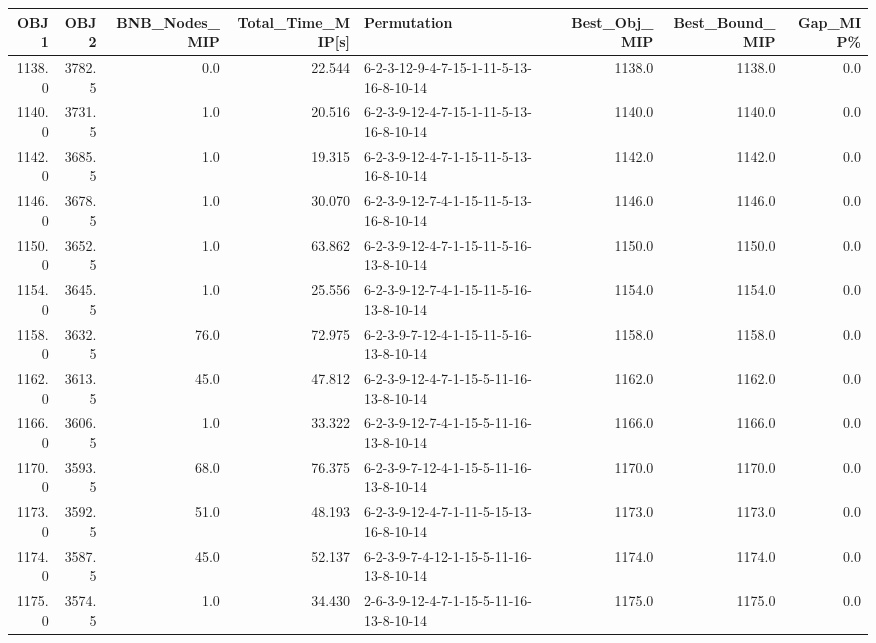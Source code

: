 \begin{tabular}{rrrrlrrr}
\toprule
   OBJ1 &    OBJ2 &  BNB\_Nodes\_MIP &  Total\_Time\_MIP[s] &                             Permutation &  Best\_Obj\_MIP &  Best\_Bound\_MIP &  Gap\_MIP\% \\
\midrule
 1138.0 &  3782.5 &            0.0 &             22.544 &  6-2-3-12-9-4-7-15-1-11-5-13-16-8-10-14 &        1138.0 &          1138.0 &       0.0 \\
 1140.0 &  3731.5 &            1.0 &             20.516 &  6-2-3-9-12-4-7-15-1-11-5-13-16-8-10-14 &        1140.0 &          1140.0 &       0.0 \\
 1142.0 &  3685.5 &            1.0 &             19.315 &  6-2-3-9-12-4-7-1-15-11-5-13-16-8-10-14 &        1142.0 &          1142.0 &       0.0 \\
 1146.0 &  3678.5 &            1.0 &             30.070 &  6-2-3-9-12-7-4-1-15-11-5-13-16-8-10-14 &        1146.0 &          1146.0 &       0.0 \\
 1150.0 &  3652.5 &            1.0 &             63.862 &  6-2-3-9-12-4-7-1-15-11-5-16-13-8-10-14 &        1150.0 &          1150.0 &       0.0 \\
 1154.0 &  3645.5 &            1.0 &             25.556 &  6-2-3-9-12-7-4-1-15-11-5-16-13-8-10-14 &        1154.0 &          1154.0 &       0.0 \\
 1158.0 &  3632.5 &           76.0 &             72.975 &  6-2-3-9-7-12-4-1-15-11-5-16-13-8-10-14 &        1158.0 &          1158.0 &       0.0 \\
 1162.0 &  3613.5 &           45.0 &             47.812 &  6-2-3-9-12-4-7-1-15-5-11-16-13-8-10-14 &        1162.0 &          1162.0 &       0.0 \\
 1166.0 &  3606.5 &            1.0 &             33.322 &  6-2-3-9-12-7-4-1-15-5-11-16-13-8-10-14 &        1166.0 &          1166.0 &       0.0 \\
 1170.0 &  3593.5 &           68.0 &             76.375 &  6-2-3-9-7-12-4-1-15-5-11-16-13-8-10-14 &        1170.0 &          1170.0 &       0.0 \\
 1173.0 &  3592.5 &           51.0 &             48.193 &  6-2-3-9-12-4-7-1-11-5-15-13-16-8-10-14 &        1173.0 &          1173.0 &       0.0 \\
 1174.0 &  3587.5 &           45.0 &             52.137 &  6-2-3-9-7-4-12-1-15-5-11-16-13-8-10-14 &        1174.0 &          1174.0 &       0.0 \\
 1175.0 &  3574.5 &            1.0 &             34.430 &  2-6-3-9-12-4-7-1-15-5-11-16-13-8-10-14 &        1175.0 &          1175.0 &       0.0 \\

\end{tabular}
